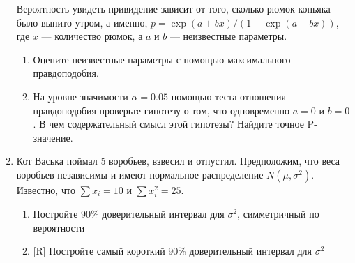 \documentclass[12pt, a4paper]{article}\usepackage[]{graphicx}\usepackage[]{color}
\begin{document}
\begin{enumerate}
Вероятность увидеть привидение зависит от того, сколько рюмок коньяка было выпито утром, а именно, $p=\exp(a+bx)/(1+ \exp(a+bx))$, где $x$ — количество рюмок, а $a$ и $b$ — неизвестные параметры.

\begin{enumerate}
\item Оцените неизвестные параметры с помощью максимального правдоподобия.
\item На уровне значимости $\alpha=0.05$ помощью теста отношения правдоподобия проверьте гипотезу о том, что одновременно $a=0$ и $b=0$. В чем содержательный смысл этой гипотезы? Найдите точное P-значение.
\end{enumerate}




\item Кот Васька поймал 5 воробьев, взвесил и отпустил. Предположим, что веса воробьев независимы и имеют нормальное распределение $N(\mu,\sigma^2)$. Известно, что $\sum x_i=10$ и $\sum x_i^2=25$.
\begin{enumerate}
\item Постройте 90\% доверительный интервал для $\sigma^2$, симметричный по вероятности
\item $[$R]  Постройте самый короткий 90\% доверительный интервал для $\sigma^2$
\end{enumerate}



\end{enumerate}
\end{document}

